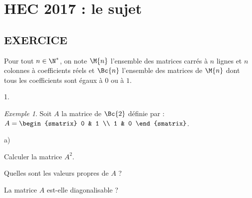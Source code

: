 \chapter*{HEC 2017 : le sujet}
  
%

% 

\section*{EXERCICE}

\noindent
Pour tout $n\in\N^*$, on note $\M{n}$ l'ensemble des matrices carrés à
$n$ lignes et $n$ colonnes à coefficients réels et $\Bc{n}$ l'ensemble
des matrices de $\M{n}$ dont tous les coefficients sont égaux à $0$ ou
à $1$.
\begin{noliste}{1.}
  \setlength{\itemsep}{4mm}
\item {\it Exemple 1}. Soit $A$ la matrice de $\Bc{2}$ définie par :
  $A = 
  \begin{smatrix} 
    0 & 1 \\ 
    1 & 0
  \end{smatrix}$.
  \begin{noliste}{a)}
    \setlength{\itemsep}{2mm}
  \item Calculer la matrice $A^2$.
    
    
    
  \item Quelles sont les valeurs propres de $A$ ?
	
    
	



  \item La matrice $A$ est-elle diagonalisable ?
	
    
  \end{noliste}


\end{noliste}
